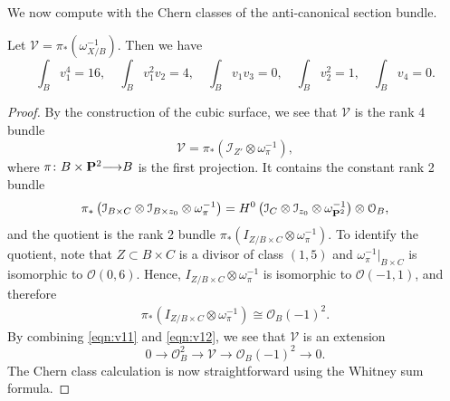 \documentclass[11pt,reqno, letterpaper]{amsart}
\renewcommand{\to}{{\longrightarrow}}
\numberwithin{equation}{section}
\renewcommand{\O}{\mathcal O}
\begin{document}
We now compute with the Chern classes of the anti-canonical section bundle.
\begin{proposition}\label{lem:v1}
  Let $\mathcal V = \pi_* \left( \omega_{X/B}^{-1} \right)$.
  Then we have
  \[
    \int_{B}v_{1}^{4} = 16, \quad \int_{B}v_{1}^{2}v_{2} = 4,\quad \int_{B}v_{1}v_{3} =0,\quad \int_{B}v_2^{2} = 1,\quad \int_{B}v_{4} = 0.\]
\end{proposition}
\begin{proof}
By the construction of the cubic surface, we see that $\mathcal V$ is the rank 4 bundle
\[ \mathcal V = \pi_* (\mathcal I_{Z'} \otimes \omega_{\pi}^{-1}),\]
where $\pi \colon B \times \P^2 \to B$ is the first projection.
It contains the constant rank 2 bundle
\begin{equation}\label{eqn:v11}
  \pi_*\left( \mathcal I_{B \times C} \otimes \mathcal I_{B \times z_0} \otimes \omega_\pi^{-1} \right) = H^0\left(\mathcal I_{C} \otimes \mathcal I_{z_0} \otimes \omega_{\P^2}^{-1}\right) \otimes \O_{B},
\end{equation}
and the quotient is the rank 2 bundle $\pi_*\left( I_{Z/B \times C} \otimes \omega_\pi^{-1} \right)$.
To identify the quotient, note that $Z \subset B \times C$ is a divisor of class $(1,5)$ and $\omega^{-1}_{\pi}|_{B\times C}$ is isomorphic to $\O(0,6)$.
Hence, $I_{Z/B \times C} \otimes \omega_\pi^{-1}$ is isomorphic to $\O(-1,1)$, and therefore
\begin{equation}\label{eqn:v12}
  \begin{split}
    \pi_*\left( I_{Z/B \times C} \otimes \omega_\pi^{-1} \right) \cong \O_{B}(-1)^{2}.
  \end{split}
\end{equation}
By combining \eqref{eqn:v11} and \eqref{eqn:v12}, we see that $\mathcal V$ is an extension
\begin{equation}\label{eqn:V1}
  0 \to \O_{B}^2 \to \mathcal V \to \O_{B}(-1)^2 \to 0.
\end{equation}
The Chern class calculation is now straightforward using the Whitney sum formula.
\end{proof}
\end{document}
